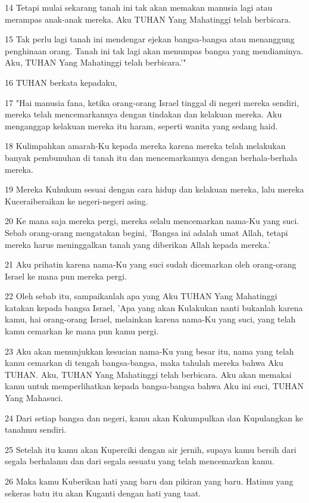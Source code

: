 \par 14 Tetapi mulai sekarang tanah ini tak akan memakan manusia lagi atau merampas anak-anak mereka. Aku TUHAN Yang Mahatinggi telah berbicara.
\par 15 Tak perlu lagi tanah ini mendengar ejekan bangsa-bangsa atau menanggung penghinaan orang. Tanah ini tak lagi akan menumpas bangsa yang mendiaminya. Aku, TUHAN Yang Mahatinggi telah berbicara.'"
\par 16 TUHAN berkata kepadaku,
\par 17 "Hai manusia fana, ketika orang-orang Israel tinggal di negeri mereka sendiri, mereka telah mencemarkannya dengan tindakan dan kelakuan mereka. Aku menganggap kelakuan mereka itu haram, seperti wanita yang sedang haid.
\par 18 Kulimpahkan amarah-Ku kepada mereka karena mereka telah melakukan banyak pembunuhan di tanah itu dan mencemarkannya dengan berhala-berhala mereka.
\par 19 Mereka Kuhukum sesuai dengan cara hidup dan kelakuan mereka, lalu mereka Kuceraiberaikan ke negeri-negeri asing.
\par 20 Ke mana saja mereka pergi, mereka selalu mencemarkan nama-Ku yang suci. Sebab orang-orang mengatakan begini, 'Bangsa ini adalah umat Allah, tetapi mereka harus meninggalkan tanah yang diberikan Allah kepada mereka.'
\par 21 Aku prihatin karena nama-Ku yang suci sudah dicemarkan oleh orang-orang Israel ke mana pun mereka pergi.
\par 22 Oleh sebab itu, sampaikanlah apa yang Aku TUHAN Yang Mahatinggi katakan kepada bangsa Israel, 'Apa yang akan Kulakukan nanti bukanlah karena kamu, hai orang-orang Israel, melainkan karena nama-Ku yang suci, yang telah kamu cemarkan ke mana pun kamu pergi.
\par 23 Aku akan menunjukkan kesucian nama-Ku yang besar itu, nama yang telah kamu cemarkan di tengah bangsa-bangsa, maka tahulah mereka bahwa Aku TUHAN. Aku, TUHAN Yang Mahatinggi telah berbicara. Aku akan memakai kamu untuk memperlihatkan kepada bangsa-bangsa bahwa Aku ini suci, TUHAN Yang Mahasuci.
\par 24 Dari setiap bangsa dan negeri, kamu akan Kukumpulkan dan Kupulangkan ke tanahmu sendiri.
\par 25 Setelah itu kamu akan Kuperciki dengan air jernih, supaya kamu bersih dari segala berhalamu dan dari segala sesuatu yang telah mencemarkan kamu.
\par 26 Maka kamu Kuberikan hati yang baru dan pikiran yang baru. Hatimu yang sekeras batu itu akan Kuganti dengan hati yang taat.
